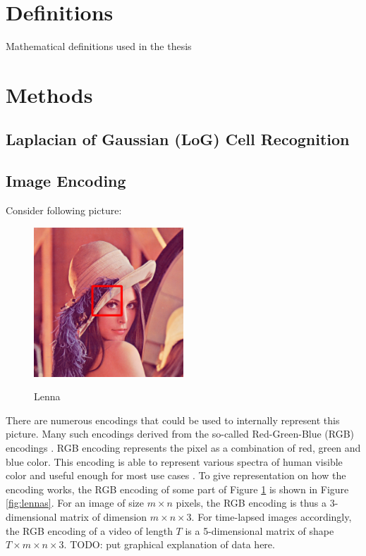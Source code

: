 \documentclass[pdftex,12pt,a4paper]{report}
\begin{document}
\section{Definitions}

Mathematical definitions used in the thesis

\section{Methods}

\lipsum[1]

\subsection{Laplacian of Gaussian (LoG) Cell Recognition}

\lipsum[1]

\subsection{Image Encoding}

Consider following picture:

\begin{figure}[h]
\centering
\includegraphics[width=0.5\textwidth]{images/lenna_marked}
\label{fig:lenna}
\caption{Lenna}

\end{figure}

There are numerous encodings that could be used to internally represent this picture. Many such encodings derived from the so-called Red-Green-Blue (RGB) encodings \cite{sonka2014image}. RGB encoding represents the pixel as a combination of red, green and blue color. This encoding is able to represent various spectra of human visible color and useful enough for most use cases \cite{sonka2014image, jayant1993signal}. To give representation on how the encoding works, the RGB encoding of some part of Figure \ref{fig:lenna} is shown in Figure \ref{fig:lennas}. For an image of size $m \times n$ pixels, the RGB encoding is thus a 3-dimensional matrix of dimension $m \times n \times 3$. For time-lapsed images accordingly, the RGB encoding of a video of length $T$ is a 5-dimensional matrix of shape $T \times m \times n \times 3$. TODO: put graphical explanation of data here.
\end{document}
